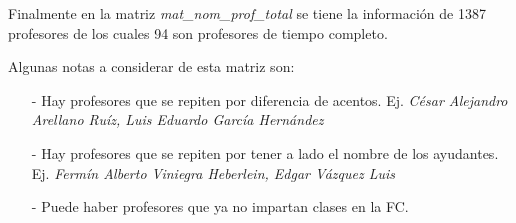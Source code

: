 Finalmente en la matriz \textit{mat\_nom\_prof\_total} se tiene la información de 1387 profesores de los cuales 94 son profesores de tiempo completo.

Algunas notas a considerar de esta matriz son:

\begin{itemize}
\item[-] Hay profesores que se repiten por diferencia de acentos. Ej. \textit{César Alejandro Arellano Ruíz, Luis Eduardo García Hernández}

\item[-] Hay profesores que se repiten por tener a lado el nombre de los ayudantes. Ej. \textit{Fermín Alberto Viniegra Heberlein, Edgar Vázquez Luis}

\item[-] Puede haber profesores que ya no impartan clases en la FC.
\end{itemize}
